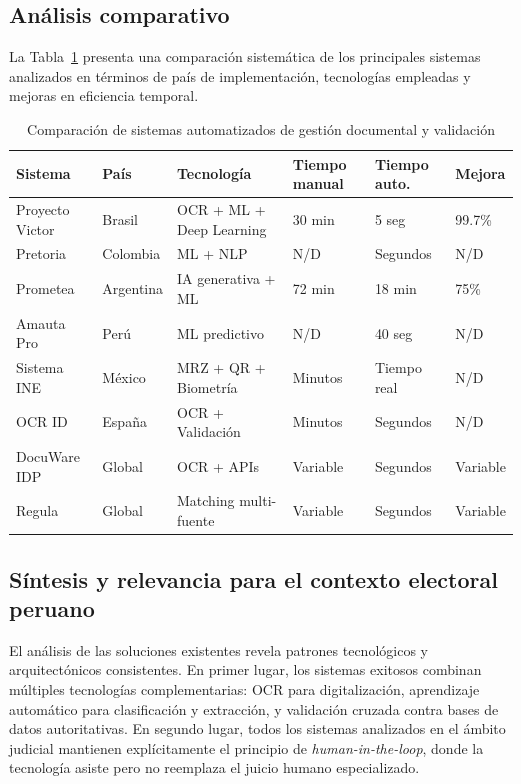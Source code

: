 \documentclass[12pt,a4paper,oneside]{book}
\begin{document}
\subsection{Análisis comparativo}

La Tabla~\ref{tab:comparacion-sistemas} presenta una comparación sistemática de los principales sistemas analizados en términos de país de implementación, tecnologías empleadas y mejoras en eficiencia temporal.

\begin{table}[H]
\centering
\caption{Comparación de sistemas automatizados de gestión documental y validación}
\label{tab:comparacion-sistemas}
\small
\begin{tabular}{@{}p{2.5cm}p{1.6cm}p{3.2cm}p{2cm}p{2cm}p{1.4cm}@{}}
\toprule
\textbf{Sistema} & \textbf{País} & \textbf{Tecnología} & \textbf{Tiempo manual} & \textbf{Tiempo auto.} & \textbf{Mejora} \\
\midrule
Proyecto Victor & Brasil & OCR + ML + Deep Learning & 30 min & 5 seg & 99.7\% \\
\addlinespace
Pretoria & Colombia & ML + NLP & N/D & Segundos & N/D \\
\addlinespace
Prometea & Argentina & IA generativa + ML & 72 min & 18 min & 75\% \\
\addlinespace
Amauta Pro & Perú & ML predictivo & N/D & 40 seg & N/D \\
\addlinespace
Sistema INE & México & MRZ + QR + Biometría & Minutos & Tiempo real & N/D \\
\addlinespace
OCR ID & España & OCR + Validación & Minutos & Segundos & N/D \\
\addlinespace
DocuWare IDP & Global & OCR + APIs & Variable & Segundos & Variable \\
\addlinespace
Regula & Global & Matching multi-fuente & Variable & Segundos & Variable \\
\bottomrule
\end{tabular}
\end{table}

\subsection{Síntesis y relevancia para el contexto electoral peruano}

El análisis de las soluciones existentes revela patrones tecnológicos y arquitectónicos consistentes. En primer lugar, los sistemas exitosos combinan múltiples tecnologías complementarias: OCR para digitalización, aprendizaje automático para clasificación y extracción, y validación cruzada contra bases de datos autoritativas. En segundo lugar, todos los sistemas analizados en el ámbito judicial mantienen explícitamente el principio de \textit{human-in-the-loop}, donde la tecnología asiste pero no reemplaza el juicio humano especializado.
\end{document}
